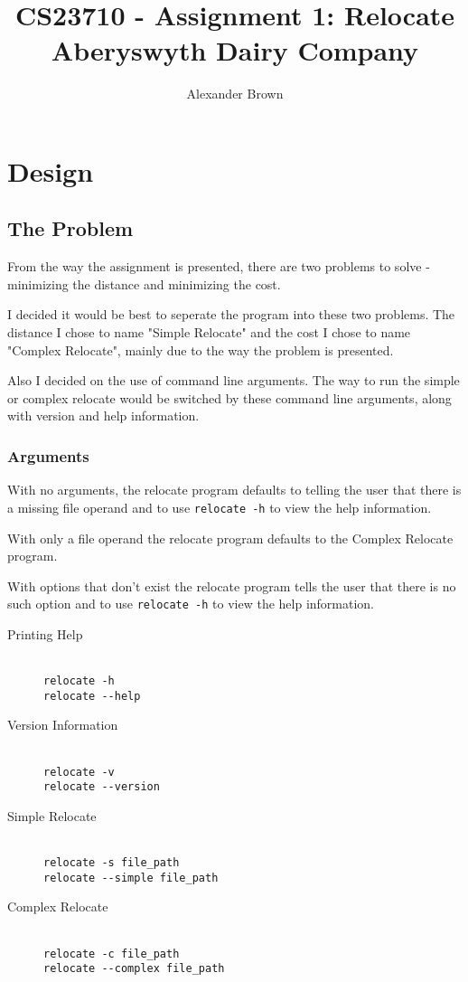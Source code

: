 \documentclass[10pt,letterpaper]{article}
\title{CS23710 - Assignment 1: Relocate Aberyswyth Dairy Company}
\author{Alexander Brown}
\begin{document}
  \maketitle
  \tableofcontents
  
  \section{Design}
    \subsection{The Problem}
      From the way the assignment is presented, there are two problems to solve - minimizing the distance and minimizing the cost.
      
      I decided it would be best to seperate the program into these two problems. The distance I chose to name "Simple Relocate" and the cost I chose to name "Complex Relocate", mainly due to the way the problem is presented.
      
      Also I decided on the use of command line arguments. The way to run the simple or complex relocate would be switched by these command line arguments, along with version and help information.
      
      
      \subsubsection{Arguments}
	With no arguments, the relocate program defaults to telling the user that there is a missing file operand and to use \verb+relocate -h+ to view the help information.
	
	With only a file operand the relocate program defaults to the Complex Relocate program.
	
	With options that don't exist the relocate program tells the user that there is no such option and to use \verb+relocate -h+ to view the help information.
	
	\begin{description}
	  \item[Printing Help]\hfill\\
	    \verb+relocate -h+\\
	    \verb+relocate --help+ 
	    
	  \item[Version Information]\hfill\\ 
	    \verb+relocate -v+\\
	    \verb+relocate --version+
	    
	  \item[Simple Relocate]\hfill\\ 
	    \verb+relocate -s file_path+\\
	    \verb+relocate --simple file_path+
	    
	  \item[Complex Relocate]\hfill\\ 
	    \verb+relocate -c file_path+\\
	    \verb+relocate --complex file_path+
	\end{description}
	
\end{document}
